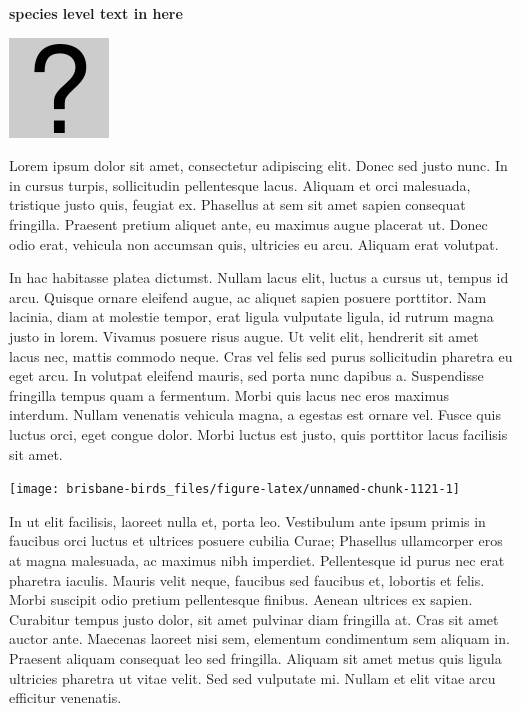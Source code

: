\documentclass[]{book}
\let\origfigure\figure
\let\endorigfigure\endfigure
\renewenvironment{figure}[1][2] {
  \expandafter\origfigure\expandafter[H]
} {
  \endorigfigure
}
\begin{document}
\textbf{species level text in here}

\begin{figure}
\centering
\includegraphics{assets/missing.png}
\caption{No image for species}
\end{figure}

Lorem ipsum dolor sit amet, consectetur adipiscing elit. Donec sed justo
nunc. In in cursus turpis, sollicitudin pellentesque lacus. Aliquam et
orci malesuada, tristique justo quis, feugiat ex. Phasellus at sem sit
amet sapien consequat fringilla. Praesent pretium aliquet ante, eu
maximus augue placerat ut. Donec odio erat, vehicula non accumsan quis,
ultricies eu arcu. Aliquam erat volutpat.

In hac habitasse platea dictumst. Nullam lacus elit, luctus a cursus ut,
tempus id arcu. Quisque ornare eleifend augue, ac aliquet sapien posuere
porttitor. Nam lacinia, diam at molestie tempor, erat ligula vulputate
ligula, id rutrum magna justo in lorem. Vivamus posuere risus augue. Ut
velit elit, hendrerit sit amet lacus nec, mattis commodo neque. Cras vel
felis sed purus sollicitudin pharetra eu eget arcu. In volutpat eleifend
mauris, sed porta nunc dapibus a. Suspendisse fringilla tempus quam a
fermentum. Morbi quis lacus nec eros maximus interdum. Nullam venenatis
vehicula magna, a egestas est ornare vel. Fusce quis luctus orci, eget
congue dolor. Morbi luctus est justo, quis porttitor lacus facilisis sit
amet.

\begin{figure}
\texttt{[image: brisbane-birds\_files/figure-latex/unnamed-chunk-1121-1]} \caption{insert figure caption}\label{fig:unnamed-chunk-1121}
\end{figure}

In ut elit facilisis, laoreet nulla et, porta leo. Vestibulum ante ipsum
primis in faucibus orci luctus et ultrices posuere cubilia Curae;
Phasellus ullamcorper eros at magna malesuada, ac maximus nibh
imperdiet. Pellentesque id purus nec erat pharetra iaculis. Mauris velit
neque, faucibus sed faucibus et, lobortis et felis. Morbi suscipit odio
pretium pellentesque finibus. Aenean ultrices ex sapien. Curabitur
tempus justo dolor, sit amet pulvinar diam fringilla at. Cras sit amet
auctor ante. Maecenas laoreet nisi sem, elementum condimentum sem
aliquam in. Praesent aliquam consequat leo sed fringilla. Aliquam sit
amet metus quis ligula ultricies pharetra ut vitae velit. Sed sed
vulputate mi. Nullam et elit vitae arcu efficitur venenatis.
\end{document}
